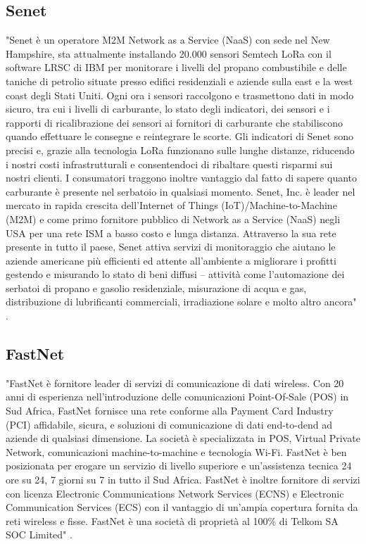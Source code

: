 \documentclass[a4paper]{report} %
\begin{document}
\subsection{Senet}
"Senet è un operatore M2M Network as a Service (NaaS) con sede nel New Hampshire, sta attualmente installando 20.000 sensori Semtech LoRa con il software LRSC di IBM per monitorare i livelli del propano combustibile e delle taniche di petrolio situate presso edifici residenziali e aziende sulla east e la west coast degli Stati Uniti. Ogni ora i sensori raccolgono e trasmettono dati in modo sicuro, tra cui i livelli di carburante, lo stato degli indicatori, dei sensori e i rapporti di ricalibrazione dei sensori ai fornitori di carburante che stabiliscono quando effettuare le consegne e reintegrare le scorte. Gli indicatori di Senet sono precisi e, grazie alla tecnologia LoRa funzionano sulle lunghe distanze, riducendo i nostri costi infrastrutturali e consentendoci di ribaltare questi risparmi sui nostri clienti. I consumatori traggono inoltre vantaggio dal fatto di sapere quanto carburante è presente nel serbatoio in qualsiasi momento.
Senet, Inc. è leader nel mercato in rapida crescita dell'Internet of Things (IoT)/Machine-to-Machine (M2M) e come primo fornitore pubblico di Network as a Service (NaaS) negli USA per una rete ISM a basso costo e lunga distanza. Attraverso la sua rete presente in tutto il paese, Senet attiva servizi di monitoraggio che aiutano le aziende americane più efficienti ed attente all'ambiente a migliorare i profitti gestendo e misurando lo stato di beni diffusi -- attività come l'automazione dei serbatoi di propano e gasolio residenziale, misurazione di acqua e gas, distribuzione di lubrificanti commerciali, irradiazione solare e molto altro ancora" \cite{art:rif.26}.

\subsection{FastNet}
"FastNet è fornitore leader di servizi di comunicazione di dati wireless. Con 20 anni di esperienza nell'introduzione delle comunicazioni Point-Of-Sale (POS) in Sud Africa, FastNet fornisce una rete conforme alla Payment Card Industry (PCI) affidabile, sicura, e soluzioni di comunicazione di dati end-to-dend ad aziende di qualsiasi dimensione. La società è specializzata in POS, Virtual Private Network, comunicazioni machine-to-machine e tecnologia Wi-Fi.
FastNet è ben posizionata per erogare un servizio di livello superiore e un'assistenza tecnica 24 ore su 24, 7 giorni su 7 in tutto il Sud Africa. FastNet è inoltre fornitore di servizi con licenza Electronic Communications Network Services (ECNS) e Electronic Communication Services (ECS) con il vantaggio di un'ampia copertura fornita da reti wireless e fisse.
FastNet è una società di proprietà al 100\% di Telkom SA SOC Limited" \cite{art:rif.26}. 
\end{document}
